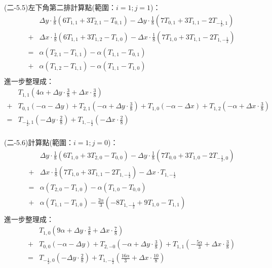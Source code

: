 \documentclass[12pt]{article}
\begin{document}
\noindent (二-5.5)左下角第二排計算點(範圍：$i = 1 ; j = 1$)：\\
\begin{equation}
\begin{split}
  &\Delta y \cdot \frac{1}{8}\left(6T_{1,1}+3T_{2,1}-T_{0,1}\right) 
  - \Delta y  \cdot \frac{1}{8}\left(7T_{0,1}+3T_{1,1}-2T_{-\frac{1}{2},1}\right)  \\
  + &\Delta x \cdot \frac{1}{8}\left(6T_{1,1}+3T_{1,2}-T_{1,0}\right)  
  - \Delta x\cdot \frac{1}{8}\left(7T_{1,0}+3T_{1,1}-2T_{1,-\frac{1}{2}}\right) \\
  = &\alpha (T_{2,1}-T_{1,1}) - \alpha (T_{1,1}-T_{0,1})\\ 
  + &\alpha (T_{1,2}-T_{1,1}) - \alpha (T_{1,1}-T_{1,0}) \\
\end{split}
\end{equation}
\noindent 進一步整理成：
\begin{equation}
\begin{split}
  &T_{1,1}(4\alpha+\Delta y \cdot \frac{3}{8}+\Delta x \cdot \frac{3}{8})\\
  +&T_{0,1}(- \alpha- \Delta y)+T_{2,1}(- \alpha+\Delta y \cdot \frac{3}{8})+T_{1,0}(- \alpha- \Delta x)+T_{1,2}(- \alpha+\Delta x \cdot \frac{3}{8})\\
  =&T_{-\frac{1}{2},1}(-\Delta y  \cdot \frac{2}{8}) + T_{1,-\frac{1}{2}}(-\Delta x\cdot \frac{2}{8})\\
\end{split}
\end{equation}

\noindent (二-5.6)計算點(範圍：$i = 1 ; j = 0$)：\\
\begin{equation}
\begin{split}
   &\Delta y \cdot \frac{1}{8}\left(6T_{1,0}+3T_{2,0}-T_{0,0}\right)- \Delta y  \cdot \frac{1}{8}\left(7T_{0,0}+3T_{1,0}-2T_{-\frac{1}{2},0}\right)  \\
  +&\Delta x \cdot \frac{1}{8}\left(7T_{1,0}+3T_{1,1}-2T_{1,-\frac{1}{2}}\right) -\Delta x \cdot T_{1,-\frac{1}{2}}\\
  =&\alpha (T_{2,0}-T_{1,0})-  \alpha (T_{1,0}-T_{0,0})\\
  +&\alpha (T_{1,1}-T_{1,0}) -  \frac{2\alpha}{3} (-8T_{1,-\frac{1}{2}}+ 9T_{1,0}-T_{1,1})\\
\end{split}
\end{equation}
\noindent 進一步整理成：
\begin{equation}
\begin{split}
  &T_{1,0}(9\alpha+\Delta y \cdot \frac{3}{8}+\Delta x \cdot \frac{7}{8})\\
  +&T_{0,0}(-\alpha-\Delta y) + T_{2,-0}(-\alpha+\Delta y \cdot \frac{3}{8}) + T_{1,1}(-\frac{5\alpha}{3}+\Delta x \cdot \frac{3}{8}) \\
  =&T_{-\frac{1}{2},0}(- \Delta y  \cdot \frac{2}{8}) + T_{1,-\frac{1}{2}}(\frac{16\alpha}{3}+\Delta x \cdot \frac{10}{8})\\
\end{split}
\end{equation}
\end{document}
